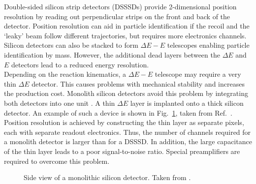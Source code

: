 %
Double-sided silicon strip detectors (DSSSDs) provide 2-dimensional position resolution by reading out perpendicular strips on the front and back of the detector. Position resolution can aid in particle identification if the recoil and the `leaky' beam follow different trajectories, but requires more electronics channels. Silicon detectors can also be stacked to form $\Delta{}E-E$ telescopes enabling particle identification by mass. However, the additional dead layers between the $\Delta{}E$ and $E$ detectors lead to a reduced energy resolution.\\  
Depending on the reaction kinematics, a $\Delta{}E-E$ telescope may require a very thin $\Delta{}E$ detector. This causes problems with mechanical stability and increases the production cost. Monolith silicon detectors avoid this problem by integrating both detectors into one unit \cite{card96}. A thin $\Delta{}E$ layer is implanted onto a thick silicon detector. An example of such a device is shown in Fig.\ \ref{fig:monolith}, taken from Ref.\ \cite{tudi99}. Position resolution is achieved by constructing the thin layer as separate pixels, each with separate readout electronics. Thus, the number of channels required for a monolith detector is larger than for a DSSSD. In addition, the large capacitance of the thin layer leads to a poor signal-to-noise ratio. Special preamplifiers are required to overcome this problem.%
%
\begin{figure}
\centering
{}
\caption{Side view of a monolithic silicon detector. Taken from \cite{tudi99}.}
\label{fig:monolith}
\end{figure}
%

